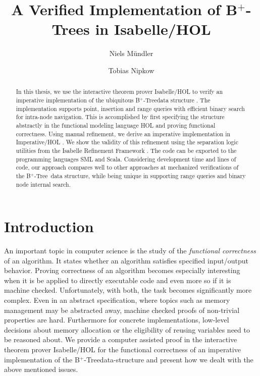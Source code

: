 \documentclass[a4paper,UKenglish,cleveref, autoref, thm-restate]{lipics-v2021}
\title{A Verified Implementation of B$^+$-Trees in Isabelle/HOL}
\author{Niels Mündler}{Department of Computer Science, ETH Zurich, Switzerland}{n.muendler@tum.de}{https://orcid.org/0000-0003-3851-2557}{}%
\author{Tobias Nipkow}{Department of Informatics, Technical University of Munich, Germany}{nipkow@in.tum.de}{https://orcid.org/0000-0003-0730-515X}{}
\newcommand{\btree}{B$^+$-Tree}
\begin{document}
\maketitle

\begin{abstract}
    In this thesis, we use the interactive theorem prover Isabelle/HOL \cite{DBLP:books/sp/NipkowPW02} to verify
    an imperative implementation of the ubiquitous \btree data structure \cite{DBLP:journals/acta/BayerM72}.
    The implementation supports point, insertion and range queries with efficient binary
    search for intra-node navigation. This is accomplished by first specifying the structure
    abstractly in the functional modeling language HOL and proving functional correctness.
    Using manual refinement, we derive an imperative implementation in Imperative/HOL
    \cite{DBLP:conf/tphol/BulwahnKHEM08}. We show the validity of this refinement using the separation logic utilities
    from the Isabelle Refinement Framework \cite{DBLP:conf/itp/Lammich19}. The code can be exported to the
    programming languages SML and Scala. Considering development time and lines of code, our approach
    compares well to other approaches at mechanized verifications of the \btree\ data
    structure, while being unique in supporting range queries and binary node internal search.
\end{abstract}

\section{Introduction}
\label{sec:introduction}


An important topic in computer science is the study of the
\textit{functional correctness} of an algorithm.
It states whether an algorithm satisfies specified
input/output behavior.
Proving correctness of an algorithm
becomes especially interesting when it is be applied
to directly executable code and even more so if it is machine checked.
Unfortunately, with both, the task becomes
significantly more complex.
Even in an abstract specification, where topics such as
memory management may be abstracted away,
machine checked proofs of non-trivial properties
are hard.
Furthermore for concrete implementations,
low-level decisions about memory allocation or
the eligibility of reusing variables need to be
reasoned about.
We provide a computer assisted proof in the interactive
theorem prover Isabelle/HOL \cite{DBLP:books/sp/NipkowPW02} for the functional
correctness of an imperative implementation of the \btree data-structure
and present how we dealt with the above mentioned issues.
\end{document}

